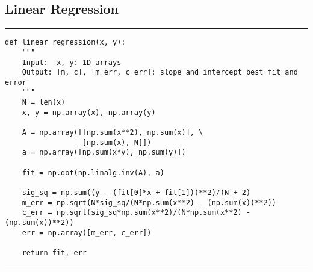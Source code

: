 \documentclass[preprint]{aastex62}
\begin{document}
\subsection{Linear Regression} \label{code:regression}
\hrule
\begin{lstlisting}
def linear_regression(x, y):
    """
    Input:  x, y: 1D arrays
    Output: [m, c], [m_err, c_err]: slope and intercept best fit and error
    """
    N = len(x)
    x, y = np.array(x), np.array(y)

    A = np.array([[np.sum(x**2), np.sum(x)], \
                  [np.sum(x), N]])
    a = np.array([np.sum(x*y), np.sum(y)])

    fit = np.dot(np.linalg.inv(A), a)

    sig_sq = np.sum((y - (fit[0]*x + fit[1]))**2)/(N + 2)
    m_err = np.sqrt(N*sig_sq/(N*np.sum(x**2) - (np.sum(x))**2))
    c_err = np.sqrt(sig_sq*np.sum(x**2)/(N*np.sum(x**2) - (np.sum(x))**2))
    err = np.array([m_err, c_err])

    return fit, err
\end{lstlisting}
\hrule \vspace{7pt}
\end{document}
